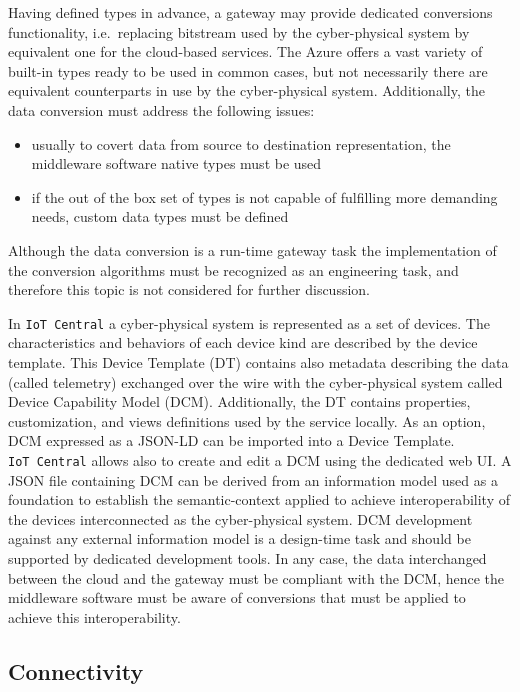 \documentclass[
]{article}
\providecommand{\tightlist}{%
  \setlength{\itemsep}{0pt}\setlength{\parskip}{0pt}}
\begin{document}
Having defined types in advance, a gateway may provide dedicated
conversions functionality, i.e.~replacing bitstream used by the
cyber-physical system by equivalent one for the cloud-based services.
The Azure offers a vast variety of built-in types ready to be used in
common cases, but not necessarily there are equivalent counterparts in
use by the cyber-physical system. Additionally, the data conversion must
address the following issues:

\begin{itemize}
\tightlist
\item
  usually to covert data from source to destination representation, the
  middleware software native types must be used
\item
  if the out of the box set of types is not capable of fulfilling more
  demanding needs, custom data types must be defined
\end{itemize}

Although the data conversion is a run-time gateway task the
implementation of the conversion algorithms must be recognized as an
engineering task, and therefore this topic is not considered for further
discussion.

In \texttt{IoT\ Central} a cyber-physical system is represented as a set
of devices. The characteristics and behaviors of each device kind are
described by the device template. This Device Template (DT) contains
also metadata describing the data (called telemetry) exchanged over the
wire with the cyber-physical system called Device Capability Model
(DCM). Additionally, the DT contains properties, customization, and
views definitions used by the service locally. As an option, DCM
expressed as a JSON-LD can be imported into a Device Template.
\texttt{IoT\ Central} allows also to create and edit a DCM using the
dedicated web UI. A JSON file containing DCM can be derived from an
information model used as a foundation to establish the semantic-context
applied to achieve interoperability of the devices interconnected as the
cyber-physical system. DCM development against any external information
model is a design-time task and should be supported by dedicated
development tools. In any case, the data interchanged between the cloud
and the gateway must be compliant with the DCM, hence the middleware
software must be aware of conversions that must be applied to achieve
this interoperability.

\hypertarget{connectivity}{%
\subsection{Connectivity}\label{connectivity}}
\end{document}
